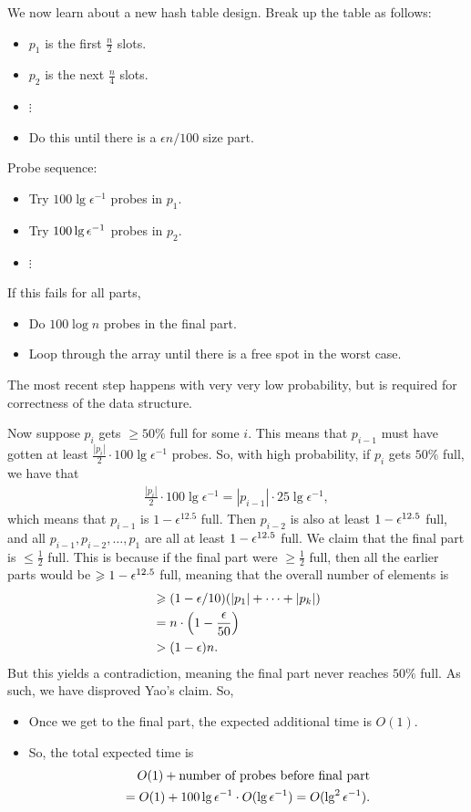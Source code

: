 \documentclass{report}
\begin{document}
\newpage
\noindent We now learn about a new hash table design. Break up the table as follows:
\begin{itemize}
    \item $p_1$ is the first $\frac n2$ slots.
    \item $p_2$ is the next $\frac n4$ slots.
    \item $\vdots$
    \item Do this until there is a $\epsilon n / 100$ size part.
\end{itemize}
Probe sequence:
\begin{itemize}
    \item Try $100 \lg \epsilon^{-1}$ probes in $p_1$.
    \item Try $100 \lg \epsilon^{-1}$ probes in $p_2$.
    \item $\vdots$
\end{itemize}
If this fails for all parts, 
\begin{itemize}
    \item Do $100 \log n$ probes in the final part.
    \item Loop through the array until there is a free spot in the worst case.
\end{itemize}
The most recent step happens with very very low probability, but is required for correctness of the data structure. 

Now suppose $p_i$ gets $\geq 50\%$ full for some $i$. This means that $p_{i-1}$ must have gotten at least $\frac{|p_i|}{2} \cdot 100 \lg \epsilon^{-1}$ probes. So, with high probability, if $p_i$ gets $50\%$ full, we have that 
\begin{align*}
    \frac{|p_i|}{2} \cdot 100 \lg \epsilon^{-1} = |p_{i-1}| \cdot 25 \lg \epsilon^{-1},
\end{align*}
which means that $p_{i-1}$ is $1 - \epsilon^{12.5}$ full. Then $p_{i-2}$ is also at least $1 - \epsilon^{12.5}$ full, and all $p_{i-1}, p_{i-2}, \ldots, p_1$ are all at least $1-\epsilon^{12.5}$ full. We claim that the final part is $\leq \frac 12$ full. This is because if the final part were $\geq \frac 12$ full, then all the earlier parts would be $\geqslant 1-\epsilon^{12.5}$ full, meaning that the overall number of elements is 
\begin{align*}
    &\geqslant  (1 - \epsilon/10) (|p_1| + \cdots + |p_{k}|) \\
    &= n \cdot \left( 1 - \frac {\epsilon} {50}\right) \\
    &> (1-\epsilon)n.
\end{align*}
But this yields a contradiction, meaning the final part never reaches $50\%$ full. As such, we have disproved Yao's claim. So,
\begin{itemize}
    \item Once we get to the final part, the expected additional time is $O(1)$. 
    \item So, the total expected time is 
    \begin{align*}
        O(1) + \text{number of probes before final part} \\
        = O(1) + 100 \lg \epsilon^{-1} \cdot O(\lg \epsilon^{-1}) = O(\lg^2 \epsilon^{-1}).
    \end{align*}
\end{itemize}
\newpage
\end{document}
